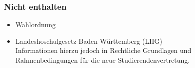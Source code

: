 
\toccontents


\subsubsection*{Nicht enthalten}
\begin{itemize}
	\item Wahlordnung
	\item Landeshoschulgesetz Baden-Württemberg (LHG)\\Informationen hierzu jedoch in Rechtliche Grundlagen und Rahmenbedingungen für die neue Studierendenvertretung.
\end{itemize}
